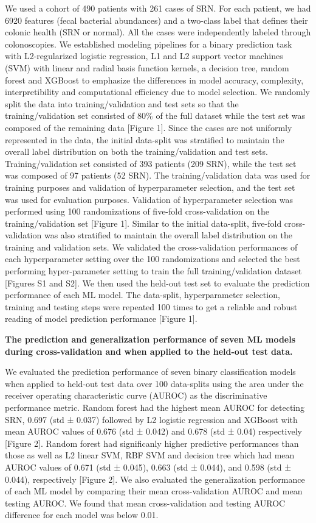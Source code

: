 \documentclass[11pt,]{article}
\begin{document}
We used a cohort of 490 patients with 261 cases of SRN. For each
patient, we had 6920 features (fecal bacterial abundances) and a
two-class label that defines their colonic health (SRN or normal). All
the cases were independently labeled through colonoscopies. We
established modeling pipelines for a binary prediction task with
L2-regularized logistic regression, L1 and L2 support vector machines
(SVM) with linear and radial basis function kernels, a decision tree,
random forest and XGBoost to emphasize the differences in model
accuracy, complexity, interpretibility and computational efficiency due
to model selection. We randomly split the data into training/validation
and test sets so that the training/validation set consisted of 80\% of
the full dataset while the test set was composed of the remaining data
{[}Figure 1{]}. Since the cases are not uniformly represented in the
data, the initial data-split was stratified to maintain the overall
label distribution on both the training/validation and test sets.
Training/validation set consisted of 393 patients (209 SRN), while the
test set was composed of 97 patients (52 SRN). The training/validation
data was used for training purposes and validation of hyperparameter
selection, and the test set was used for evaluation purposes. Validation
of hyperparameter selection was performed using 100 randomizations of
five-fold cross-validation on the training/validation set {[}Figure
1{]}. Similar to the initial data-split, five-fold cross-validation was
also stratified to maintain the overall label distribution on the
training and validation sets. We validated the cross-validation
performances of each hyperparameter setting over the 100 randomizations
and selected the best performing hyper-parameter setting to train the
full training/validation dataset {[}Figures S1 and S2{]}. We then used
the held-out test set to evaluate the prediction performance of each ML
model. The data-split, hyperparameter selection, training and testing
steps were repeated 100 times to get a reliable and robust reading of
model prediction performance {[}Figure 1{]}.

\textbf{The prediction and generalization performance of seven ML models
during cross-validation and when applied to the held-out test data.}

We evaluated the prediction performance of seven binary classification
models when applied to held-out test data over 100 data-splits using the
area under the receiver operating characteristic curve (AUROC) as the
discriminative performance metric. Random forest had the highest mean
AUROC for detecting SRN, 0.697 (std ± 0.037) followed by L2 logistic
regression and XGBoost with mean AUROC values of 0.676 (std ± 0.042) and
0.678 (std ± 0.04) respectively {[}Figure 2{]}. Random forest had
significanly higher predictive performances than those as well as L2
linear SVM, RBF SVM and decision tree which had mean AUROC values of
0.671 (std ± 0.045), 0.663 (std ± 0.044), and 0.598 (std ± 0.044),
respectively {[}Figure 2{]}. We also evaluated the generalization
performance of each ML model by comparing their mean cross-validation
AUROC and mean testing AUROC. We found that mean cross-validation and
testing AUROC difference for each model was below 0.01.
\end{document}

